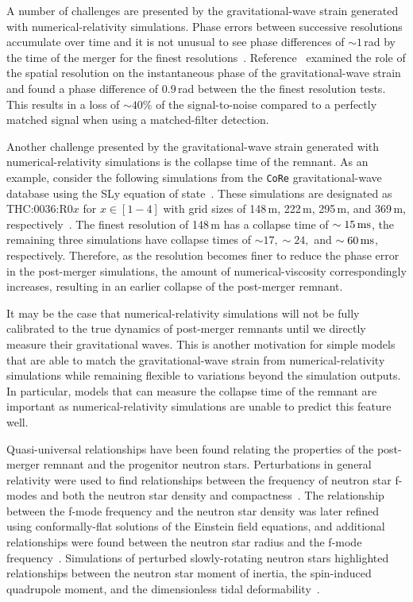 \documentclass[../Thesis.tex]{subfiles}
\begin{document}
    A number of challenges are presented by the gravitational-wave strain generated with numerical-relativity simulations.
    Phase errors between successive resolutions accumulate over time and it is not unusual to see phase differences of $\sim 1$\,rad by the time of the merger for the finest resolutions~\cite[e.g.,][]{Radice2014b}.
    Reference~\cite{Takami2015} examined the role of the spatial resolution on the instantaneous phase of the gravitational-wave strain and found a phase difference of $0.9$\,rad between the the finest resolution tests.
    This results in a loss of $\sim 40\%$ of the signal-to-noise compared to a perfectly matched signal when using a matched-filter detection. \par
    
    Another challenge presented by the gravitational-wave strain generated with numerical-relativity simulations is the collapse time of the remnant.
    As an example, consider the following simulations from the \texttt{CoRe} gravitational-wave database using the SLy equation of state~\cite{Dietrich2018,Radice2016}.
    These simulations are designated as THC:0036:R0$x$ for $x \in [1-4]$ with grid sizes of 148\,m, 222\,m, 295\,m, and 369\,m, respectively~\cite{Radice2016}.
    The finest resolution of 148\,m has a collapse time of $\sim 15\,\mathrm{ms}$, the remaining three simulations have collapse times of $\sim 17, \sim 24,$ and $\sim 60\,\mathrm{ms}$, respectively.
    Therefore, as the resolution becomes finer to reduce the phase error in the post-merger simulations, the amount of numerical-viscosity correspondingly increases,  resulting in an earlier collapse of the post-merger remnant.
    \par
    
    It may be the case that numerical-relativity simulations will not be fully calibrated to the true dynamics of post-merger remnants until we directly measure their gravitational waves.
    This is another motivation for simple models that are able to match the gravitational-wave strain from numerical-relativity simulations while remaining flexible to variations beyond the simulation outputs.
    In particular, models that can measure the collapse time of the remnant are important as numerical-relativity simulations are unable to predict this feature well. \par

 
    Quasi-universal relationships have been found relating the properties of the post-merger remnant and the progenitor neutron stars. 
    Perturbations in general relativity were used to find relationships between the frequency of neutron star f-modes and both the neutron star density and compactness~\cite{Andersson1998b}.
    The relationship between the f-mode frequency and the neutron star density was later refined using conformally-flat solutions of the Einstein field equations, and additional relationships were found between the neutron star radius and the f-mode frequency~\cite{Bauswein2012,Bauswein2012a}.
    Simulations of perturbed slowly-rotating neutron stars highlighted relationships between the neutron star moment of inertia, the spin-induced quadrupole moment, and the dimensionless tidal deformability~\cite{Yagi2013,Yagi2013a}. \par
\end{document}
